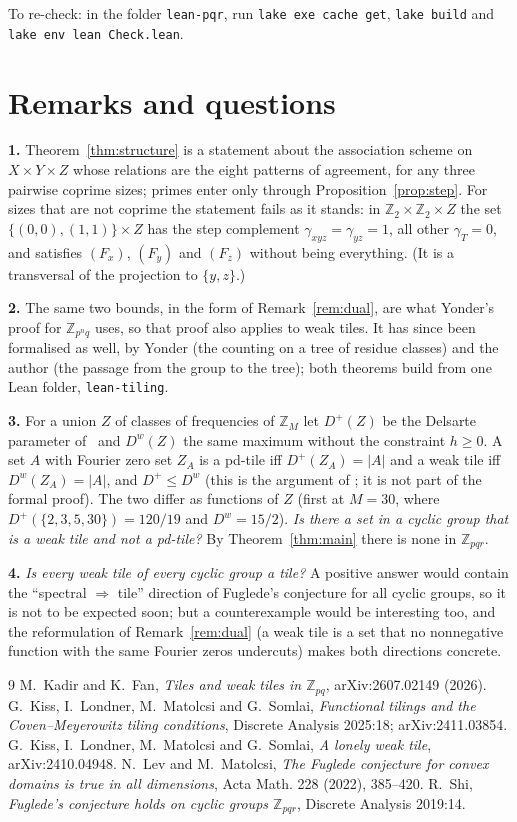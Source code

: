 \documentclass[11pt,a4paper]{amsart}
\theoremstyle{definition}
\theoremstyle{remark}
\newcommand{\Z}{\mathbb{Z}}
\begin{document}
\noindent To re-check: in the folder \texttt{lean-pqr}, run \texttt{lake exe cache get}, \texttt{lake build} and
\texttt{lake env lean Check.lean}.

\section{Remarks and questions}

\textbf{1.} Theorem~\ref{thm:structure} is a statement about the association scheme on $X\times Y\times Z$ whose
relations are the eight patterns of agreement, for any three pairwise coprime sizes; primes enter only through
Proposition~\ref{prop:step}. For sizes that are not coprime the statement fails as it stands: in
$\Z_2\times\Z_2\times Z$ the set $\{(0,0),(1,1)\}\times Z$ has the step complement
$\gamma_{xyz}=\gamma_{yz}=1$, all other $\gamma_T=0$, and satisfies $(F_x)$, $(F_y)$ and $(F_z)$ without being
everything. (It is a transversal of the projection to $\{y,z\}$.)

\textbf{2.} The same two bounds, in the form of Remark~\ref{rem:dual}, are what Yonder's proof for $\Z_{p^nq}$
uses, so that proof also applies to weak tiles. It has since been formalised as well, by Yonder (the counting on a
tree of residue classes) and the author (the passage from the group to the tree); both theorems build from one
Lean folder, \texttt{lean-tiling}.

\textbf{3.} For a union $Z$ of classes of frequencies of $\Z_M$ let $D^+(Z)$ be the Delsarte parameter
of~\cite{KLMS} and $D^w(Z)$ the same maximum without the constraint $h\ge 0$. A set $A$ with Fourier zero set
$Z_A$ is a pd-tile iff $D^+(Z_A)=|A|$ and a weak tile iff $D^w(Z_A)=|A|$, and $D^+\le D^w$ (this is the
argument of \cite[Prop.~4.1]{KLMS}; it is not part of the formal proof). The two differ as
functions of $Z$ (first at $M=30$, where $D^+(\{2,3,5,30\})=120/19$ and $D^w=15/2$). \emph{Is there a set in
a cyclic group that is a weak tile and not a pd-tile?} By Theorem~\ref{thm:main} there is none in $\Z_{pqr}$.

\textbf{4.} \emph{Is every weak tile of every cyclic group a tile?} A positive answer would contain the
``spectral $\Rightarrow$ tile'' direction of Fuglede's conjecture for all cyclic groups, so it is not to be
expected soon; but a counterexample would be interesting too, and the reformulation of Remark~\ref{rem:dual}
(a weak tile is a set that no nonnegative function with the same Fourier zeros undercuts) makes both directions
concrete.

\begin{thebibliography}{9}
 M.~Kadir and K.~Fan, \emph{Tiles and weak tiles in $\Z_{pq}$}, arXiv:2607.02149 (2026).
 G.~Kiss, I.~Londner, M.~Matolcsi and G.~Somlai, \emph{Functional tilings and the
 Coven--Meyerowitz tiling conditions}, Discrete Analysis 2025:18; arXiv:2411.03854.
 G.~Kiss, I.~Londner, M.~Matolcsi and G.~Somlai, \emph{A lonely weak tile}, arXiv:2410.04948.
 N.~Lev and M.~Matolcsi, \emph{The Fuglede conjecture for convex domains is true in all
 dimensions}, Acta Math. 228 (2022), 385--420.
 R.~Shi, \emph{Fuglede's conjecture holds on cyclic groups $\Z_{pqr}$}, Discrete Analysis 2019:14.
\end{thebibliography}
\end{document}

